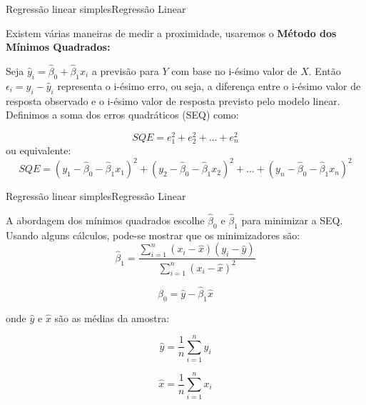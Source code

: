 \documentclass[t]{beamer}
\begin{document}
\begin{ftst}{Regressão linear simples}{Regressão Linear}

Existem várias maneiras de medir a proximidade, usaremos o \textbf{Método dos Mínimos Quadrados:}

\vone
Seja $\hat{y}_i = \hat{\beta}_0 + \hat{\beta}_1 x_i$ a previsão para $Y$ com base no i-ésimo valor de $X$. 
\vone
Então $\epsilon_i = y_i - \hat{y}_i$ representa o i-ésimo erro, ou seja, a diferença entre o i-ésimo valor de resposta observado e o i-ésimo valor de resposta previsto pelo modelo linear.
\vone
Definimos a soma dos erros quadráticos (SEQ) como:

\begin{equation}
    SQE = e^2_1 + e^2_2 + \ldots + e^2_n
\end{equation}
ou equivalente:
\begin{equation}
    SQE = (y_1 - \hat{\beta}_0 - \hat{\beta}_1 x_1)^2 + (y_2 - \hat{\beta}_0 - \hat{\beta}_1 x_2)^2 + \ldots + (y_n - \hat{\beta}_0 - \hat{\beta}_1 x_n)^2
\end{equation}


\end{ftst}


\begin{ftst}{Regressão linear simples}{Regressão Linear}

A abordagem dos mínimos quadrados escolhe $\hat{\beta}_0$ e $\hat{\beta}_1$ para minimizar a SEQ. Usando alguns cálculos, pode-se mostrar que os minimizadores são:
\begin{equation}
    \hat{\beta}_1 = \frac{\sum_{i=1}^n (x_i - \hat{x})(y_i - \hat{y})}
    {\sum_{i=1}^n (x_i - \hat{x})^2}
\end{equation}

\begin{equation}
    \hat{\beta}_0 = \hat{y} - \hat{\beta}_1 \hat{x}
\end{equation}

onde $\hat{y}$ e $\hat{x}$ são as médias da amostra:

\begin{equation}
    \hat{y} = \frac{1}{n} \sum_{i=1}^{n} y_i
\end{equation}

\begin{equation}
    \hat{x} = \frac{1}{n} \sum_{i=1}^{n} x_i
\end{equation}


\end{ftst}
\end{document}
